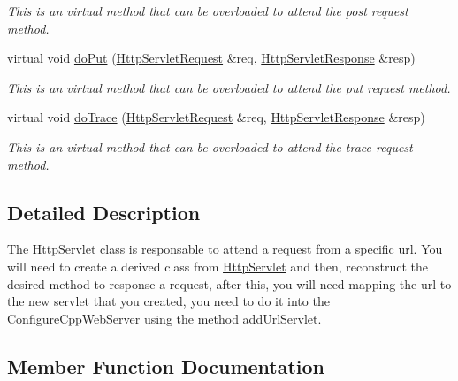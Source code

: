 \begin{DoxyCompactItemize}
\begin{DoxyCompactList}\small\item\em This is an virtual method that can be overloaded to attend the post request method. \end{DoxyCompactList}\item 
virtual void \mbox{\hyperlink{class_http_servlet_a33edf48c6762b1c9f5e7faaf47135073}{do\+Put}} (\mbox{\hyperlink{class_http_servlet_request}{Http\+Servlet\+Request}} \&req, \mbox{\hyperlink{class_http_servlet_response}{Http\+Servlet\+Response}} \&resp)
\begin{DoxyCompactList}\small\item\em This is an virtual method that can be overloaded to attend the put request method. \end{DoxyCompactList}\item 
virtual void \mbox{\hyperlink{class_http_servlet_a42a6a6a556f43b3447d4ff56d9d574cb}{do\+Trace}} (\mbox{\hyperlink{class_http_servlet_request}{Http\+Servlet\+Request}} \&req, \mbox{\hyperlink{class_http_servlet_response}{Http\+Servlet\+Response}} \&resp)
\begin{DoxyCompactList}\small\item\em This is an virtual method that can be overloaded to attend the trace request method. \end{DoxyCompactList}\end{DoxyCompactItemize}


\subsection{Detailed Description}
The \mbox{\hyperlink{class_http_servlet}{Http\+Servlet}} class is responsable to attend a request from a specific url. You will need to create a derived class from \mbox{\hyperlink{class_http_servlet}{Http\+Servlet}} and then, reconstruct the desired method to response a request, after this, you will need mapping the url to the new servlet that you created, you need to do it into the Configure\+Cpp\+Web\+Server using the method add\+Url\+Servlet. 

\subsection{Member Function Documentation}
\mbox{\label{class_http_servlet_a773a855260ff0977ae4c4a861008092c}} 

